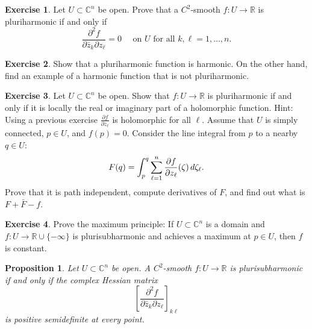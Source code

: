 \documentclass[12pt,openany]{book}
\newcommand{\avoidbreak}{\postdisplaypenalty=100}
\newcommand{\C}{{\mathbb{C}}}
\newcommand{\R}{{\mathbb{R}}}
\theoremstyle{plain}
\newtheorem{prop}[thm]{Proposition}
\theoremstyle{remark}
\theoremstyle{definition}
\newenvironment{exbox}{%
    \def\FrameCommand{\vrule width 1pt \relax\hspace{10pt}}%
    \MakeFramed{\advance\hsize-\width\FrameRestore}%
}{%
    \endMakeFramed
}
\theoremstyle{exercise}
\newtheorem{exercise}{Exercise}[section]
\theoremstyle{example}
\begin{document}
\begin{exbox}
\begin{exercise}
Let $U \subset \C^n$ be open.
Prove that
a $C^2$-smooth $f \colon U \to \R$ is pluriharmonic if and
only if
\begin{equation*}
\frac{\partial^2 f}{\partial \bar{z}_k \partial z_\ell} = 0
\quad \text{ on $U$ for all $k,\ell=1,\ldots,n$.}
\end{equation*}
\end{exercise}

\begin{exercise}
Show that a pluriharmonic function is harmonic.  On the other hand, find an
example of a harmonic function that is not pluriharmonic.
\end{exercise}

\begin{exercise}
Let $U \subset \C^n$ be open.
Show that $f \colon U \to \R$ is pluriharmonic if and
only if it is locally the real or imaginary part of a holomorphic function.
Hint:  Using a previous exercise
$\frac{\partial f}{\partial z_\ell}$ is holomorphic for all $\ell$.
Assume that $U$ is simply connected, $p \in U$, and
$f(p) = 0$.
Consider the line integral from $p$ to a nearby $q \in U$:
\begin{equation*}
F(q) =
\int_{p}^q \sum_{\ell=1}^n
\frac{\partial f}{\partial z_\ell}(\zeta) \, d\zeta_\ell .
\avoidbreak
\end{equation*}
Prove that it is path independent, compute derivatives of $F$, and
find out what is $F+\bar{F}-f$.
\end{exercise}

\begin{exercise}
Prove the maximum
principle:
If $U \subset \C^n$ is a domain and $f \colon U \to \R \cup
\{-\infty\}$ is
plurisubharmonic and achieves a maximum at $p \in U$, then $f$ is constant.
\end{exercise}
\end{exbox}

\begin{samepage}
\begin{prop}
Let $U \subset \C^n$ be open.
A $C^2$-smooth $f \colon U \to \R$ is plurisubharmonic
if and only if the complex Hessian matrix
\begin{equation*}
\left[
\frac{\partial^2 f}{\partial \bar{z}_k \partial z_\ell}
\right]_{k\ell}
\end{equation*}
is positive semidefinite at every
point.
\end{prop}
\end{samepage}
\end{document}
